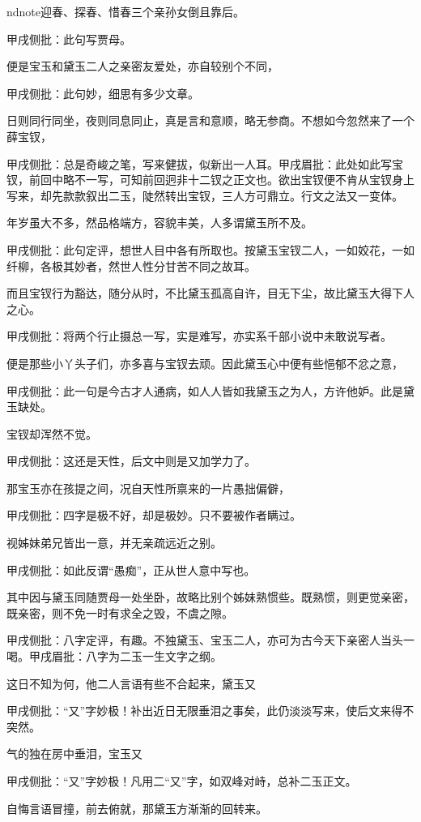 \begin{parag}
nd{note}迎春、探春、惜春三个亲孙女倒且靠后。\begin{note}甲戌侧批：此句写贾母。\end{note}便是宝玉和黛玉二人之亲密友爱处，亦自较别个不同，\begin{note}甲戌侧批：此句妙，细思有多少文章。\end{note}日则同行同坐，夜则同息同止，真是言和意顺，略无参商。不想如今忽然来了一个薛宝钗，\begin{note}甲戌侧批：总是奇峻之笔，写来健拔，似新出一人耳。甲戌眉批：此处如此写宝钗，前回中略不一写，可知前回迥非十二钗之正文也。欲出宝钗便不肯从宝钗身上写来，却先款款叙出二玉，陡然转出宝钗，三人方可鼎立。行文之法又一变体。\end{note}年岁虽大不多，然品格端方，容貌丰美，人多谓黛玉所不及。\begin{note}甲戌侧批：此句定评，想世人目中各有所取也。按黛玉宝钗二人，一如姣花，一如纤柳，各极其妙者，然世人性分甘苦不同之故耳。\end{note}而且宝钗行为豁达，随分从时，不比黛玉孤高自许，目无下尘，故比黛玉大得下人之心。\begin{note}甲戌侧批：将两个行止摄总一写，实是难写，亦实系千部小说中未敢说写者。\end{note}便是那些小丫头子们，亦多喜与宝钗去顽。因此黛玉心中便有些悒郁不忿之意，\begin{note}甲戌侧批：此一句是今古才人通病，如人人皆如我黛玉之为人，方许他妒。此是黛玉缺处。\end{note}宝钗却浑然不觉。\begin{note}甲戌侧批：这还是天性，后文中则是又加学力了。\end{note}那宝玉亦在孩提之间，况自天性所禀来的一片愚拙偏僻，\begin{note}甲戌侧批：四字是极不好，却是极妙。只不要被作者瞒过。\end{note}视姊妹弟兄皆出一意，并无亲疏远近之别。\begin{note}甲戌侧批：如此反谓“愚痴”，正从世人意中写也。\end{note}其中因与黛玉同随贾母一处坐卧，故略比别个姊妹熟惯些。既熟惯，则更觉亲密，既亲密，则不免一时有求全之毁，不虞之隙。\begin{note}甲戌侧批：八字定评，有趣。不独黛玉、宝玉二人，亦可为古今天下亲密人当头一喝。甲戌眉批：八字为二玉一生文字之纲。\end{note}这日不知为何，他二人言语有些不合起来，黛玉又\begin{note}甲戌侧批：“又”字妙极！补出近日无限垂泪之事矣，此仍淡淡写来，使后文来得不突然。\end{note}气的独在房中垂泪，宝玉又\begin{note}甲戌侧批：“又”字妙极！凡用二“又”字，如双峰对峙，总补二玉正文。\end{note}自悔言语冒撞，前去俯就，那黛玉方渐渐的回转来。
\end{parag}


